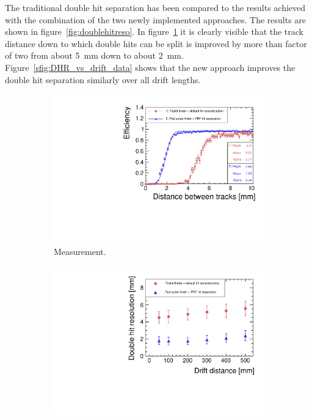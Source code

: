 The traditional double hit separation has been compared to the results achieved with the combination of the two newly implemented approaches.
The results are shown in figure~\ref{fig:doublehitreso}. 
In figure~\ref{sfig:doublehitreso_data} it is clearly visible that the track distance down to which double hits can be split is improved by more than factor of two from about \SI{5}{\mm} down to about \SI{2}{\mm}. 
Figure~\ref{sfig:DHR_vs_drift_data} shows that the new approach improves the double hit separation similarly over all drift lengths.

\begin{figure}[tbhp!]
\begin{subfigure}[b]{0.5\textwidth}
\includegraphics[width=\textwidth]{Tracker/TPC_Bonn/plots/TPC-DG_DHR_comp_Claus_Tripl_Bare2.pdf}
\caption{Measurement.}
\label{sfig:doublehitreso_data}
\end{subfigure}%
\begin{subfigure}[b]{0.5\textwidth}
\includegraphics[width=\textwidth]{Tracker/TPC_Bonn/plots/TPC-DG_DHR_vs_drift_data.pdf}

\end{subfigure}
\end{figure}

